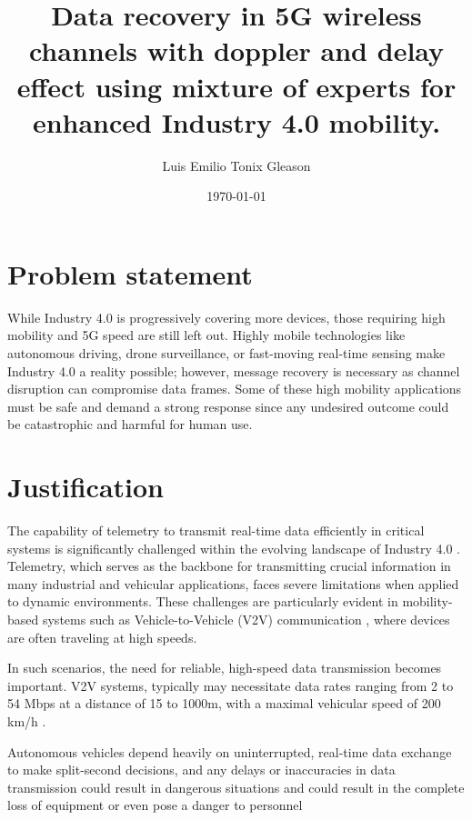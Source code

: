 \documentclass{article}
\title{Data recovery in 5G wireless channels with doppler and delay effect using mixture of experts for enhanced Industry 4.0 mobility.}
\author{Luis Emilio Tonix Gleason}
\date{\today}
\begin{document}
\maketitle

\section{Problem statement}

While Industry 4.0 is progressively covering more devices, those requiring high mobility and 5G speed are still left out. 
Highly mobile technologies like autonomous driving, drone surveillance, or fast-moving real-time sensing make Industry 4.0 
a reality possible; however, message recovery is necessary as channel disruption can compromise data frames. Some of these 
high mobility applications must be safe and demand a strong response since any undesired outcome could be catastrophic and 
harmful for human use.


\section{Justification}

The capability of telemetry to transmit real-time data efficiently in critical systems is significantly challenged within the evolving landscape of Industry 4.0 \cite{5GReady}. 
Telemetry, which serves as the backbone for transmitting crucial information in many industrial and vehicular applications, faces severe limitations when applied to dynamic environments. 
These challenges are particularly evident in mobility-based systems such as Vehicle-to-Vehicle (V2V) communication \cite{V2V}, where devices are often traveling at high speeds.

In such scenarios, the need for reliable, high-speed data transmission becomes important. 
V2V systems, typically may necessitate data rates ranging from 2 to 54 Mbps at a distance of 15 to 1000m, with a maximal vehicular speed of 200 km/h \cite{DopplereffectV2V}.

Autonomous vehicles depend heavily on uninterrupted, 
real-time data exchange to make split-second decisions, and any delays or inaccuracies in data transmission could result in dangerous situations \cite{AutonomousRemoteSensing}
and could result in the complete loss of equipment or even pose a danger to personnel
\end{document}
